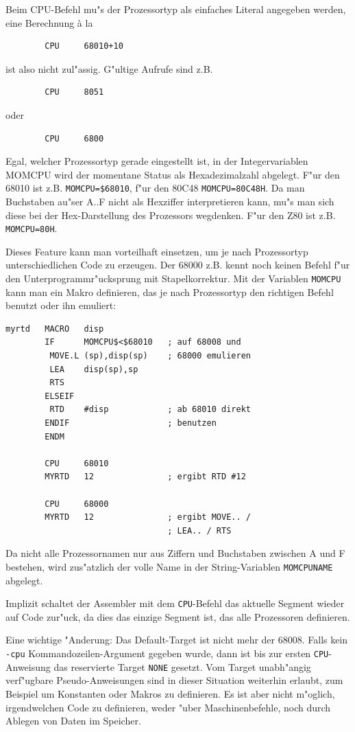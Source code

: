 \documentclass[12pt,a4paper,twoside]{report}
\newcommand{\tty}[1]{{\tt #1}}
\begin{document}
Beim CPU-Befehl mu"s der Prozessortyp als einfaches Literal
angegeben werden, eine Berechnung \`a la
\begin{verbatim}
        CPU     68010+10
\end{verbatim}
ist also nicht zul"assig.  G"ultige Aufrufe sind z.B.
\begin{verbatim}
        CPU     8051
\end{verbatim}
oder
\begin{verbatim}
        CPU     6800
\end{verbatim}
Egal, welcher Prozessortyp gerade eingestellt ist, in der
Integervariablen MOMCPU wird der momentane Status als Hexadezimalzahl
abgelegt.  F"ur den 68010 ist z.B. \tty{MOMCPU=\$68010}, f"ur den 80C48
\tty{MOMCPU=80C48H}.  Da man Buchstaben au"ser A..F nicht als Hexziffer
interpretieren kann, mu"s man sich diese bei der Hex-Darstellung
des Prozessors wegdenken. F"ur den Z80 ist z.B. \tty{MOMCPU=80H}.
\par
Dieses Feature kann
man vorteilhaft einsetzen, um je nach Prozessortyp unterschiedlichen
Code zu erzeugen.  Der 68000 z.B. kennt noch keinen Befehl f"ur den
Unterprogrammr"ucksprung mit Stapelkorrektur.  Mit der Variablen
\tty{MOMCPU} kann man ein Makro definieren, das je nach Prozessortyp den
richtigen Befehl benutzt oder ihn emuliert:
\begin{verbatim}
myrtd   MACRO   disp
        IF      MOMCPU$<$68010   ; auf 68008 und
         MOVE.L (sp),disp(sp)    ; 68000 emulieren
         LEA    disp(sp),sp
         RTS
        ELSEIF
         RTD    #disp            ; ab 68010 direkt
        ENDIF                    ; benutzen
        ENDM

        CPU     68010
        MYRTD   12               ; ergibt RTD #12

        CPU     68000
        MYRTD   12               ; ergibt MOVE.. /
                                 ; LEA.. / RTS
\end{verbatim}
Da nicht alle Prozessornamen nur aus Ziffern und Buchstaben zwischen
A und F bestehen, wird zus"atzlich der volle Name in der
String-Variablen \tty{MOMCPUNAME} abgelegt.
\par
Implizit schaltet der Assembler mit dem \tty{CPU}-Befehl das aktuelle Segment
wieder auf Code zur"uck, da dies das einzige Segment ist, das alle
Prozessoren definieren.
\par
Eine wichtige "Anderung: Das Default-Target ist nicht mehr der 68008.  Falls
kein {\tt -cpu} Kommandozeilen-Argument gegeben wurde, dann ist bis zur
ersten \tty{CPU}-Anweisung das reservierte Target \tty{NONE} gesetzt.  Vom
Target unabh"angig verf"ugbare Pseudo-Anweisungen sind in dieser Situation
weiterhin erlaubt, zum Beispiel um Konstanten oder Makros zu definieren.
Es ist aber nicht m"oglich, irgendwelchen Code zu definieren, weder "uber
Maschinenbefehle, noch durch Ablegen von Daten im Speicher.
\end{document}
